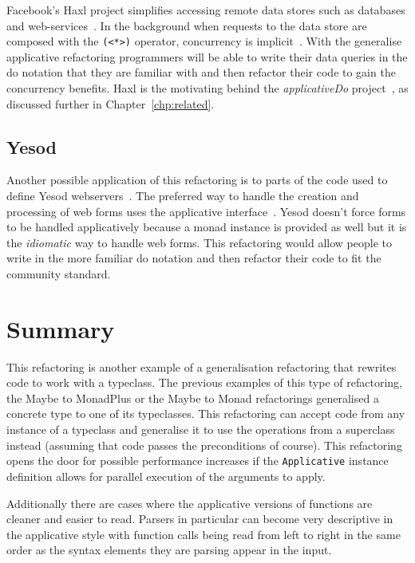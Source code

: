 Facebook's Haxl project simplifies accessing remote data stores such as databases and web-services~\citep{haxl}. In the background when requests to the data store are composed with the \texttt{(<*>)} operator, concurrency is implicit~\citep{haxl}. With the generalise applicative refactoring programmers will be able to write their data queries in the do notation that they are familiar with and then refactor their code to gain the concurrency benefits. Haxl is the motivating behind the \textit{applicativeDo} project~\citep{applicativeDo}, as discussed further in Chapter~\ref{chp:related}.

\subsection{Yesod}
Another possible application of this refactoring is to parts of the code used to define Yesod webservers~\citep{yesod}. The preferred way to handle the creation and processing of web forms uses the applicative interface~\citep{yesodBook}. Yesod doesn't force forms to be handled applicatively because a monad instance is provided as well but it is the \textit{idiomatic} way to handle web forms. This refactoring would allow people to write in the more familiar do notation and then refactor their code to fit the community standard.

\section{Summary}

This refactoring is another example of a generalisation refactoring that rewrites code to work with a typeclass. The previous examples of this type of refactoring, the Maybe to MonadPlus or the Maybe to Monad refactorings generalised a concrete type to one of its typeclasses. This refactoring can accept code from any instance of a typeclass and generalise it to use the operations from a superclass instead (assuming that code passes the preconditions of course). This refactoring opens the door for possible performance increases if the \texttt{Applicative} instance definition allows for parallel execution of the arguments to apply.

Additionally there are cases where the applicative versions of functions are cleaner and easier to read. Parsers in particular can become very descriptive in the applicative style with function calls being read from left to right in the same order as the syntax elements they are parsing appear in the input. 

